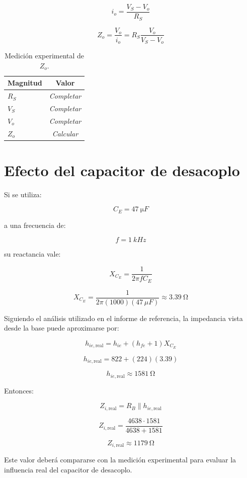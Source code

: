 \documentclass[a4paper,12pt]{article}
\begin{document}
\[
i_o
=
\frac{V_S-V_o}{R_S}
\]

\[
Z_o
=
\frac{V_o}{i_o}
=
R_S\frac{V_o}{V_S-V_o}
\]

\begin{table}[H]
\centering
\caption{Medición experimental de $Z_o$.}
\begin{tabular}{lc}
\toprule
Magnitud & Valor\\
\midrule
$R_S$ & \textit{Completar}\\
$V_S$ & \textit{Completar}\\
$V_o$ & \textit{Completar}\\
$Z_o$ & \textit{Calcular}\\
\bottomrule
\end{tabular}
\end{table}

\section{Efecto del capacitor de desacoplo}

Si se utiliza:

\[
C_E=\SI{47}{\micro F}
\]

a una frecuencia de:

\[
f=\SI{1}{kHz}
\]

su reactancia vale:

\[
X_{C_E}
=
\frac{1}{2\pi f C_E}
\]

\[
X_{C_E}
=
\frac{1}{2\pi(1000)(47\,\mu F)}
\approx
\boxed{\SI{3.39}{\ohm}}
\]

Siguiendo el análisis utilizado en el informe de referencia, la impedancia vista desde la base puede
aproximarse por:

\[
h_{ie,\mathrm{real}}
=
h_{ie}
+
(h_{fe}+1)X_{C_E}
\]

\[
h_{ie,\mathrm{real}}
=
822
+
(224)(3.39)
\]

\[
\boxed{h_{ie,\mathrm{real}}\approx\SI{1581}{\ohm}}
\]

Entonces:

\[
Z_{i,\mathrm{real}}
=
R_B\parallel h_{ie,\mathrm{real}}
\]

\[
Z_{i,\mathrm{real}}
=
\frac{4638\cdot1581}{4638+1581}
\]

\[
\boxed{Z_{i,\mathrm{real}}\approx\SI{1179}{\ohm}}
\]

Este valor deberá compararse con la medición experimental para evaluar la influencia real del
capacitor de desacoplo.
\end{document}
